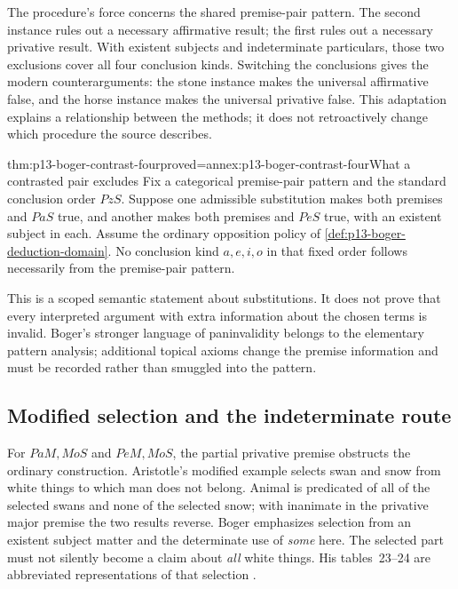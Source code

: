 The procedure's force concerns the shared premise-pair pattern. The second
instance rules out a necessary affirmative result; the first rules out a
necessary privative result. With existent subjects and indeterminate
particulars, those two exclusions cover all four conclusion kinds. Switching
the conclusions gives the modern counterarguments: the stone instance makes
the universal affirmative false, and the horse instance makes the universal
privative false. This adaptation explains a relationship between the methods;
it does not retroactively change which procedure the source describes.

\begin{hbtheorem}{thm:p13-boger-contrast-four}{proved=annex:p13-boger-contrast-four}{What a contrasted pair excludes}
Fix a categorical premise-pair pattern and the standard conclusion order
\(PzS\). Suppose one admissible substitution makes both premises and \(PaS\)
true, and another makes both premises and \(PeS\) true, with an existent
subject in each. Assume the ordinary opposition policy of
\cref{def:p13-boger-deduction-domain}. No conclusion kind \(a,e,i,o\) in
that fixed order follows necessarily from the premise-pair pattern.
\end{hbtheorem}

This is a scoped semantic statement about substitutions. It does not prove
that every interpreted argument with extra information about the chosen terms
is invalid. Boger's stronger language of paninvalidity belongs to the
elementary pattern analysis; additional topical axioms change the premise
information and must be recorded rather than smuggled into the pattern.

\subsection{Modified selection and the indeterminate route}
\label{sec:p13-boger-modified-contrast}

For \(PaM,MoS\) and \(PeM,MoS\), the partial privative premise obstructs
the ordinary construction. Aristotle's modified example selects swan and snow
from white things to which man does not belong. Animal is predicated of all
of the selected swans and none of the selected snow; with inanimate in the
privative major premise the two results reverse. Boger emphasizes selection
from an existent subject matter and the determinate use of \emph{some} here.
The selected part must not silently become a claim about \emph{all} white
things. His tables~23--24 are abbreviated representations of that selection
\parencite[pp.~192--194]{Boger2004UnderlyingLogic}.

